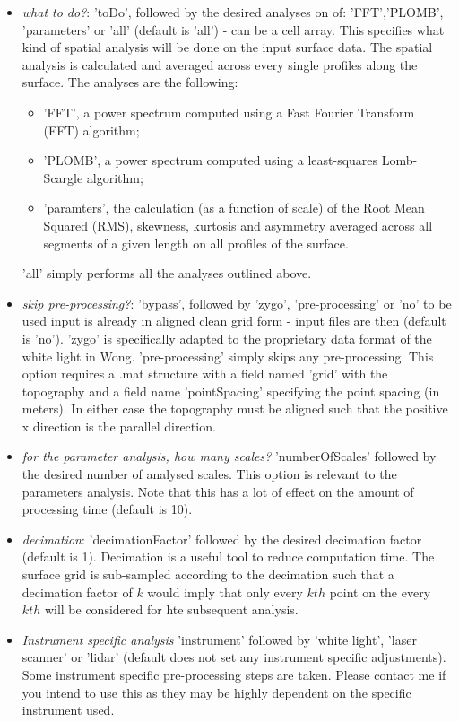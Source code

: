 \documentclass[12pt,a4paper]{article}
\begin{document}
\begin{itemize}
\item \textit{what to do?}: 'toDo', followed by the desired analyses on of: 'FFT','PLOMB', 'parameters' or 'all' (default is 'all') - can be a cell array. This specifies what kind of spatial analysis will be done on the input surface data. The spatial analysis is calculated and averaged across every single profiles along the surface.  The analyses are the following:
	\begin{itemize}
	\item 'FFT', a power spectrum computed using a Fast Fourier Transform (FFT) algorithm; 
	\item 'PLOMB', a power spectrum computed using a least-squares Lomb-Scargle algorithm;
	\item 'paramters', the calculation (as a function of scale) of the Root Mean Squared (RMS), skewness, kurtosis and asymmetry averaged across all segments of a given length on all profiles of the surface.
	\end{itemize}

'all' simply performs all the analyses outlined above.

\item \textit{skip pre-processing?}: 'bypass', followed by 'zygo', 'pre-processing' or 'no' to  be used input is already in aligned clean grid form - input files are then (default is 'no'). 'zygo' is specifically adapted to the proprietary data format of the white light in Wong. 'pre-processing' simply skips any pre-processing. This option requires a .mat structure with a field named 'grid' with the topography and a field name 'pointSpacing' specifying the point spacing (in meters). In either case the topography must be aligned such that the positive x direction is the parallel direction.	

\item \textit{for the parameter analysis, how many scales?} 'numberOfScales' followed by the desired number of analysed scales. This option is relevant to the parameters analysis. Note that this has a lot of effect on the amount of processing time (default is 10).

\item \textit{decimation}: 'decimationFactor' followed by the desired decimation factor (default is 1). Decimation is a useful tool to reduce computation time. The surface grid is sub-sampled according to the decimation such that a decimation factor of $k$ would imply that only every $kth$ point on the every $kth$ will be considered for hte subsequent analysis.

\item \textit{Instrument specific analysis} 'instrument' followed by 'white light', 'laser scanner' or 'lidar' (default does not set any instrument specific adjustments). Some instrument specific pre-processing steps are taken. Please contact me if you intend to use this as they may be highly dependent on the specific instrument used.
	 
\end{itemize}
\end{document}
